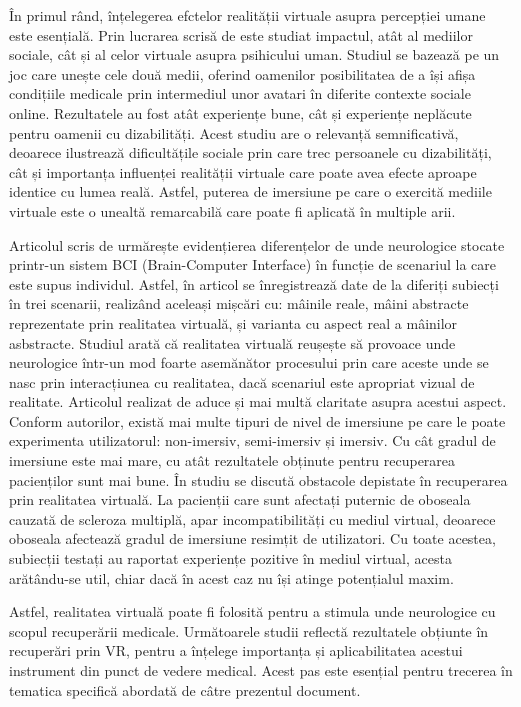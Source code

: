 \documentclass[12pt,a4paper]{report}
\theoremstyle{definition}
\theoremstyle{remark}
\begin{document}
În primul rând, înțelegerea efctelor realității virtuale asupra percepției umane este esențială. Prin lucrarea scrisă de \textcite{Angerbauer2024} este studiat impactul, atât al mediilor sociale, cât și al celor virtuale asupra psihicului uman. Studiul se bazează pe un joc care unește cele două medii, oferind oamenilor posibilitatea de a își afișa condițiile medicale prin intermediul unor avatari în diferite contexte sociale online. Rezultatele au fost atât experiențe bune, cât și experiențe neplăcute pentru oamenii cu dizabilități. Acest studiu are o relevanță semnificativă, deoarece ilustrează dificultățile sociale prin care trec persoanele cu dizabilități, cât și importanța influenței realității virtuale care poate avea efecte aproape identice cu lumea reală. Astfel, puterea de imersiune pe care o exercită mediile virtuale este o unealtă remarcabilă care poate fi aplicată în multiple arii. 

Articolul scris de \textcite{Kober2022} urmărește evidențierea diferențelor de unde neurologice stocate printr-un sistem BCI (Brain-Computer Interface) în funcție de scenariul la care este supus individul. Astfel, în articol se înregistrează date de la diferiți subiecți în trei scenarii, realizând aceleași mișcări cu: mâinile reale, mâini abstracte reprezentate prin realitatea virtuală, și varianta cu aspect real a mâinilor asbstracte. Studiul arată că realitatea virtuală reușește să provoace unde neurologice într-un mod foarte asemănător procesului prin care aceste unde se nasc prin interacțiunea cu realitatea, dacă scenariul este apropriat vizual de realitate. Articolul realizat de \textcite{Fregna2025} aduce și mai multă claritate asupra acestui aspect.  Conform autorilor, există mai multe tipuri de nivel de imersiune pe care le poate experimenta utilizatorul: non-imersiv, semi-imersiv și imersiv. Cu cât gradul de imersiune este mai mare, cu atât rezultatele obținute pentru recuperarea pacienților sunt mai bune. În studiu se discută obstacole depistate în recuperarea prin realitatea virtuală. La pacienții care sunt afectați puternic de oboseala cauzată de scleroza multiplă, apar incompatibilități cu mediul virtual, deoarece oboseala afectează gradul de imersiune resimțit de utilizatori. Cu toate acestea, subiecții testați au raportat experiențe pozitive în mediul virtual, acesta arătându-se util, chiar dacă în acest caz nu își atinge potențialul maxim.

Astfel, realitatea virtuală poate fi folosită pentru a stimula unde neurologice cu scopul recuperării medicale. Următoarele studii reflectă rezultatele obțiunte în recuperări prin VR, pentru a înțelege importanța și aplicabilitatea acestui instrument din punct de vedere medical. Acest pas este esențial pentru trecerea în tematica specifică abordată de câtre prezentul document. 
\end{document}
